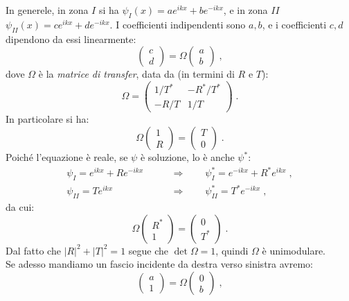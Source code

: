 \documentclass[12pt,a4paper]{report}
\theoremstyle{definition}
\numberwithin{equation}{section}
\begin{document}
In generele, in zona $I$ si ha $\psi_I(x)=ae^{ikx}+be^{-ikx}$, e in zona $II$ $\psi_{II}(x)=ce^{ikx}+de^{-ikx}$. I coefficienti indipendenti sono $a,b$, e i coefficienti $c,d$ dipendono da essi linearmente:
\begin{equation*}
\left(\begin{matrix}
c \\
d
\end{matrix}\right)=\Omega\left(
\begin{matrix}
a \\
b
\end{matrix}\right)\;,
\end{equation*}
dove $\Omega$ è la \textit{matrice di transfer}, data da (in termini di $R$ e $T$):
\begin{equation}
\Omega=\left(
\begin{matrix}
1/T^* & -R^*/T^* \\
-R/T & 1/T
\end{matrix}\right)\;.
\end{equation}
In particolare si ha:
$$
\Omega\left(
\begin{matrix}
1 \\
R
\end{matrix}\right)=\left(
\begin{matrix}
T \\
0
\end{matrix}\right)\;.
$$
Poiché l'equazione è reale, se $\psi$ è soluzione, lo è anche $\psi^*$:
\begin{align*}
\psi_I=e^{ikx}+Re^{-ikx}\qquad &\Longrightarrow \qquad \psi_I^*=e^{-ikx}+R^*e^{ikx}\;, \\
\psi_{II}=Te^{ikx} \qquad &\Longrightarrow \qquad \psi_{II}^*=T^*e^{-ikx}\;,
\end{align*}
da cui:
$$
\Omega\left(
\begin{matrix}
R^* \\
1
\end{matrix}\right)=\left(
\begin{matrix}
0 \\
T^*
\end{matrix}\right)\;.
$$
Dal fatto che $|R|^2+|T|^2=1$ segue che $\det\Omega=1$, quindi $\Omega$ è unimodulare. \\
Se adesso mandiamo un fascio incidente da destra verso sinistra avremo:
$$
\left(\begin{matrix}
a \\
1
\end{matrix}\right)=\Omega\left(
\begin{matrix}
0 \\
b
\end{matrix}\right)\;,
$$
\end{document}
